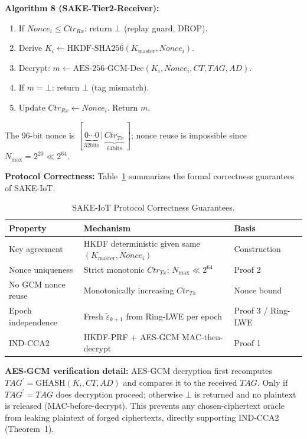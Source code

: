 \documentclass[runningheads]{llncs}
\newcommand{\Kmaster}{K_{\mathrm{master}}}
\newcommand{\Nmax}{N_{\max}}
\begin{document}
\noindent\textbf{Algorithm 8 (SAKE-Tier2-Receiver):}
\begin{enumerate}
  \item If $\mathit{Nonce}_i \leq \mathit{Ctr}_{Rx}$: return $\bot$ (replay guard, DROP).
  \item Derive $K_i \leftarrow \mathrm{HKDF\text{-}SHA256}(\Kmaster, \mathit{Nonce}_i)$.
  \item Decrypt: $m \leftarrow \mathrm{AES\text{-}256\text{-}GCM\text{-}Dec}(K_i, \mathit{Nonce}_i, CT, TAG, AD)$.
  \item If $m = \bot$: return $\bot$ (tag mismatch).
  \item Update $\mathit{Ctr}_{Rx} \leftarrow \mathit{Nonce}_i$. Return $m$.
\end{enumerate}

The 96-bit nonce is $[\,\underbrace{0\cdots0}_{32\text{bits}}\,|\,\underbrace{\mathit{Ctr}_{Tx}}_{64\text{bits}}\,]$;
nonce reuse is impossible since $\Nmax = 2^{20} \ll 2^{64}$.

\noindent\textbf{Protocol Correctness:} Table~\ref{tab:correctness} summarizes
the formal correctness guarantees of SAKE-IoT.

\begin{table}[t]
\caption{SAKE-IoT Protocol Correctness Guarantees.}
\label{tab:correctness}
\centering
\begin{tabular}{|p{2.2cm}|p{5.0cm}|p{2.0cm}|}
\hline
\textbf{Property} & \textbf{Mechanism} & \textbf{Basis} \\
\hline
Key agreement & HKDF deterministic given same $(\Kmaster, \mathit{Nonce}_i)$ & Construction \\
Nonce uniqueness & Strict monotonic $\mathit{Ctr}_{Tx}$; $\Nmax \ll 2^{64}$ & Proof 2 \\
No GCM nonce reuse & Monotonically increasing $\mathit{Ctr}_{Tx}$ & Nonce bound \\
Epoch independence & Fresh $\tilde{\varepsilon}_{k+1}$ from Ring-LWE per epoch & Proof 3 / Ring-LWE \\
IND-CCA2 & HKDF-PRF + AES-GCM MAC-then-decrypt & Proof 1 \\
\hline
\end{tabular}
\end{table}

\noindent\textbf{AES-GCM verification detail:} AES-GCM decryption first
recomputes $TAG^{\prime} = \mathrm{GHASH}(K_i, CT, AD)$ and compares it to the
received $TAG$. Only if $TAG^{\prime} = TAG$ does decryption proceed; otherwise
$\bot$ is returned and no plaintext is released (MAC-before-decrypt).
This prevents any chosen-ciphertext oracle from leaking plaintext of forged
ciphertexts, directly supporting IND-CCA2 (Theorem~1).
\end{document}
